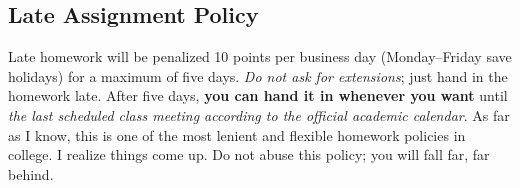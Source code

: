 \subsection*{Late Assignment Policy}

Late homework will be penalized 10 points per business day (Monday--Friday save holidays) for a maximum of five days. \textit{Do not ask for extensions}; just hand in the homework late. After five days, \textbf{you can hand it in whenever you want} until \emph{the last scheduled class meeting according to the official academic calendar}. As far as I know, this is one of the most lenient and flexible homework policies in college. I realize things come up. Do not abuse this policy; you will fall far, far behind.